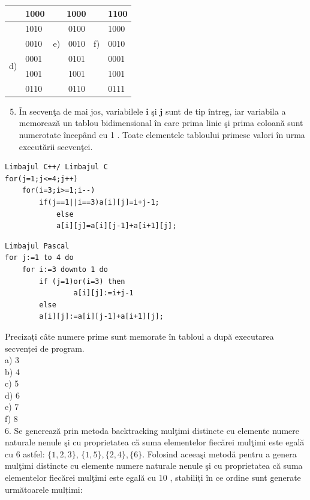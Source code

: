 \documentclass[10pt]{article}
\begin{document}
\begin{center}
\begin{tabular}{|l|l|l|l|l|l|}
\hline
\multirow{2}{*}{} & 1000 & \multicolumn{3}{|c|}{1000} & 1100 \\
\hline
 & 1010 &  & 0100 &  & 1000 \\
\hline
\multirow[t]{4}{*}{d)} & 0010 & e) & 0010 & f) & 0010 \\
\hline
 & 0001 &  & 0101 &  & 0001 \\
\hline
 & 1001 &  & 1001 &  & 1001 \\
\hline
 & 0110 &  & 0110 &  & 0111 \\
\hline
\end{tabular}
\end{center}

\begin{enumerate}
  \setcounter{enumi}{4}
  \item În secvenţa de mai jos, variabilele $\mathbf{i}$ şi $\mathbf{j}$ sunt de tip întreg, iar variabila a memorează un tablou bidimensional în care prima linie şi prima coloană sunt numerotate începând cu 1 . Toate elementele tabloului primesc valori în urma executării secvenţei.
\end{enumerate}

\begin{verbatim}
Limbajul C++/ Limbajul C
for(j=1;j<=4;j++)
    for(i=3;i>=1;i--)
        if(j==1||i==3)a[i][j]=i+j-1;
            else
            a[i][j]=a[i][j-1]+a[i+1][j];
\end{verbatim}

\begin{verbatim}
Limbajul Pascal
for j:=1 to 4 do
    for i:=3 downto 1 do
        if (j=1)or(i=3) then
                a[i][j]:=i+j-1
        else
        a[i][j]:=a[i][j-1]+a[i+1][j];
\end{verbatim}

Precizați câte numere prime sunt memorate în tabloul a după executarea secvenței de program.\\
a) 3\\
b) 4\\
c) 5\\
d) 6\\
e) 7\\
f) 8\\
6. Se generează prin metoda backtracking mulţimi distincte cu elemente numere naturale nenule şi cu proprietatea că suma elementelor fiecărei mulţimi este egală cu 6 astfel: $\{1,2,3\}$, $\{1,5\},\{2,4\},\{6\}$. Folosind aceeaşi metodă pentru a genera mulţimi distincte cu elemente numere naturale nenule şi cu proprietatea că suma elementelor fiecărei mulţimi este egală cu 10 , stabiliți în ce ordine sunt generate următoarele mulțimi:
\end{document}

